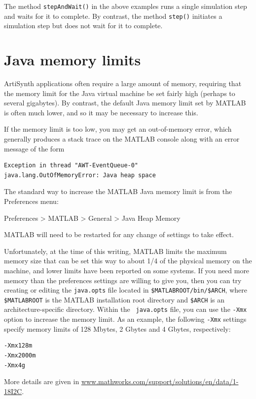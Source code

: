 \documentclass{article}
\begin{document}
\begin{sideblock}
The method {\tt stepAndWait()} in the above examples runs a single simulation
step and waits for it to complete. By contrast, the method {\tt step()}
initiates a simulation step but does not wait for it to complete.
\end{sideblock}

\section{Java memory limits}
\label{memoryLimits:sec}

ArtiSynth applications often require a large amount of memory,
requiring that the memory limit for the Java virtual machine
be set fairly high (perhaps to several gigabytes). By contrast, the
default Java memory limit set by MATLAB is often much lower, and so it
may be necessary to increase this.

If the memory limit is too low, you may get an out-of-memory error,
which generally produces a stack trace on the MATLAB console along
with an error message of the form
%
\begin{lstlisting}[]
Exception in thread "AWT-EventQueue-0"
java.lang.OutOfMemoryError: Java heap space
\end{lstlisting}
%

The standard way to increase the MATLAB Java memory limit is from the
{\sf Preferences} menu:

{\sf Preferences > MATLAB > General > Java Heap Memory}

MATLAB will need to be restarted for any change of settings to take
effect.

Unfortunately, at the time of this writing, MATLAB limits the maximum
memory size that can be set this way to about 1/4 of the physical
memory on the machine, and lower limits have been reported on some
systems. If you need more memory than the preferences
settings are willing to give you, then you can try creating or editing
the {\tt java.opts} file located in {\tt \$MATLABROOT/bin/\$ARCH},
where {\tt \$MATLABROOT} is the MATLAB installation root directory and
{\tt \$ARCH} is an architecture-specific directory. Within the {\tt
java.opts} file, you can use the {\tt -Xmx} option to increase the
memory limit. As an example, the following {\tt -Xmx} settings
specify memory limits of 128 Mbytes, 2 Gbytes and 4 Gbytes,
respectively:
%
\begin{lstlisting}[]
-Xmx128m 
-Xmx2000m
-Xmx4g
\end{lstlisting}
%
More details are given in
\href{http://www.mathworks.com/support/solutions/en/data/1-18I2C}
{www.mathworks.com/support/solutions/en/data/1-18I2C}.
\end{document}
